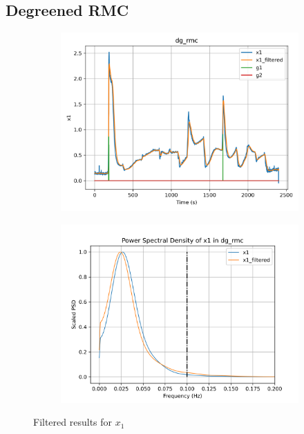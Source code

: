 \graphicspath{{Appendices/apx1_signal_est}}
\subsection{Degreened RMC}

\begin{figure}[H]

\begin{minipage}{0.49\textwidth}
        \begin{figure}[H]
                \centering
                \includegraphics[width = \textwidth]{./figs/tst_filt/dg_rmc/x1.png}
        \end{figure}
\end{minipage}
\begin{minipage}{0.49\textwidth}
        \begin{figure}[H]
                \centering
                \includegraphics[width = \textwidth]{./figs/tst_filt/dg_rmc/x1_psd.png}
        \end{figure}
\end{minipage}
\caption{Filtered results for $x_1$}

\end{figure}


